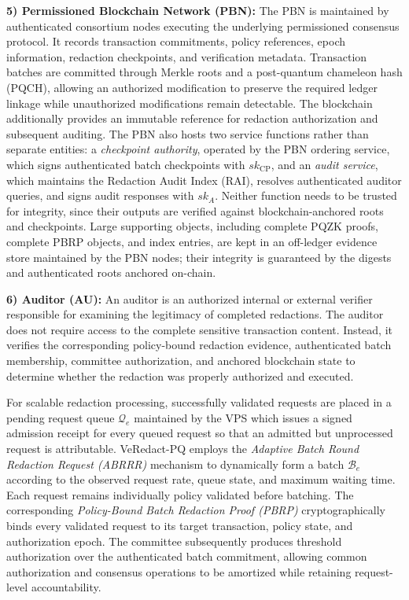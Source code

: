 \documentclass[lettersize,journal]{IEEEtran}
\begin{document}
    \textbf{5) Permissioned Blockchain Network (PBN):}
    The PBN is maintained by authenticated consortium nodes executing the
    underlying permissioned consensus protocol. It records transaction
    commitments, policy references, epoch information, redaction
    checkpoints, and verification metadata. 
    Transaction batches are
    committed through Merkle roots and a post-quantum chameleon hash
    (PQCH), allowing an authorized modification to preserve the required
    ledger linkage while unauthorized modifications remain detectable.
    The blockchain additionally provides an immutable reference for
    redaction authorization and subsequent auditing.
    {The PBN also hosts two service functions rather than
    separate entities: a \emph{checkpoint authority}, operated by the PBN
    ordering service, which signs authenticated batch checkpoints with
    $sk_{\mathrm{CP}}$, and an \emph{audit service}, which maintains the
    Redaction Audit Index (RAI), resolves authenticated auditor queries, and
    signs audit responses with $sk_A$. Neither function needs to be trusted
    for integrity, since their outputs are verified against
    blockchain-anchored roots and checkpoints.}  {Large supporting objects,
    including complete PQZK proofs, complete PBRP objects, and index
    entries, are kept in an off-ledger evidence store maintained by the PBN
    nodes; their integrity is guaranteed by the digests and authenticated
    roots anchored on-chain.}
    
    \textbf{6) Auditor (AU):}
    An auditor is an authorized internal or external verifier responsible
    for examining the legitimacy of completed redactions. The auditor does
    not require access to the complete sensitive transaction content.
    Instead, it verifies the corresponding policy-bound redaction evidence,
    authenticated batch membership, committee authorization, and anchored
    blockchain state to determine whether the redaction was properly
    authorized and executed.
    
    For scalable redaction processing, successfully validated requests are
    placed in a pending request queue { $\mathcal{Q}_e$ maintained by the VPS which issues a signed admission receipt for every queued request so that an admitted but unprocessed request is attributable}. VeRedact-PQ employs the
    \emph{Adaptive Batch Round Redaction Request (ABRRR)} mechanism to
    dynamically form a batch { $\mathcal{B}_e$} according to the observed request rate,
    queue state, and maximum waiting time. Each request remains
    individually policy validated before batching. The corresponding
    \emph{Policy-Bound Batch Redaction Proof (PBRP)} cryptographically
    binds every validated request to its target transaction, policy state,
    and authorization epoch. The committee subsequently produces threshold
    authorization over the authenticated batch commitment, allowing common
    authorization and consensus operations to be amortized while retaining
    request-level accountability.
    
\end{document}
